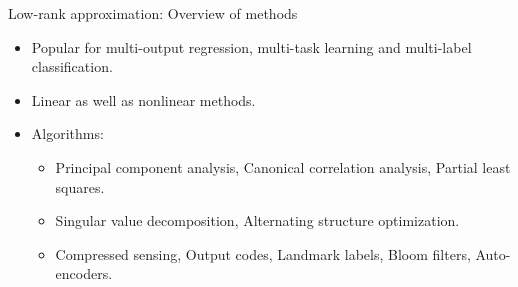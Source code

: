 \documentclass[11pt,compress,t,notes=noshow, xcolor=table]{beamer}
\begin{document}
\begin{frame}{Low-rank approximation: Overview of methods}
	
	\begin{itemize}
		\item Popular for multi-output regression, multi-task learning and multi-label classification.
		\item Linear as well as nonlinear methods.
		\item Algorithms: 
		\begin{itemize}
			\item Principal component analysis, Canonical correlation analysis, Partial least squares.
			\item Singular value decomposition, Alternating structure optimization.
			\item Compressed sensing, Output codes, Landmark labels, Bloom filters, Auto-encoders.
		\end{itemize}
	\end{itemize}
	\vspace{0.3cm}
\end{frame}


%
\endlecture
\end{document}
